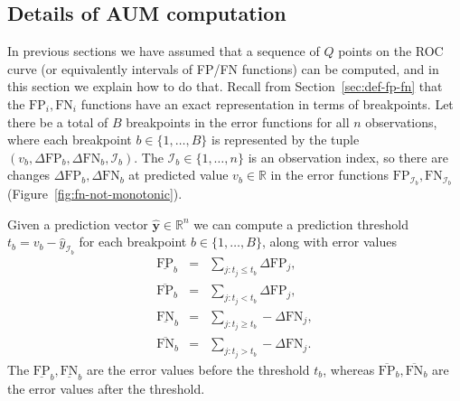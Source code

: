 \documentclass{article}
\begin{document}
\subsection{Details of AUM computation}
\label{sec:algo-aum-details}

In previous sections we have assumed that a sequence of $Q$ points on the ROC curve (or equivalently intervals of FP/FN functions) can be computed, and in this section we explain how to do that.
Recall from Section~\ref{sec:def-fp-fn} that the $\text{FP}_i,\text{FN}_i$ functions have an exact representation in terms of breakpoints.
Let there be a total of $B$ breakpoints in the error functions for all $n$ observations, where each breakpoint $b\in\{1,\dots, B\}$ is represented by the tuple $(v_b, \Delta\text{FP}_b, \Delta\text{FN}_b, \mathcal I_b)$.
The $\mathcal I_b\in\{1,\dots,n\}$ is an observation index, so there are changes $\Delta\text{FP}_b, \Delta\text{FN}_b$ at predicted value $v_b\in\mathbb R$ in the error functions $\text{FP}_{\mathcal I_b},\text{FN}_{\mathcal I_b}$ (Figure~\ref{fig:fn-not-monotonic}). 

Given a prediction vector $\mathbf{\hat y}\in\mathbb R^n$ we can compute a prediction threshold $t_b= v_b - \hat y_{\mathcal I_b}$ for each breakpoint $b\in\{1,\dots,B\}$, along with error values
\begin{eqnarray}
  \underline{\text{FP}}_b &=& \sum_{j: t_j \leq t_b} \Delta\text{FP}_j, \\
  \overline{\text{FP}}_b &=& \sum_{j: t_j < t_b} \Delta\text{FP}_j, \\
  \underline{\text{FN}}_b &=& \sum_{j: t_j \geq t_b} - \Delta\text{FN}_j, \\
  \overline{\text{FN}}_b &=& \sum_{j: t_j > t_b} - \Delta\text{FN}_j.
\end{eqnarray}
The $\underline{\text{FP}}_b, \underline{\text{FN}}_b$ are the error values before the threshold $t_b$, whereas $\overline{\text{FP}}_b, \overline{\text{FN}}_b$ are the error values after the threshold. 
\end{document}
